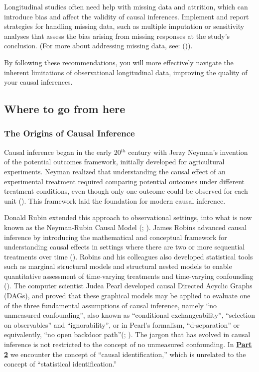 \documentclass[
  singlecolumn]{article}
\begin{document}
Longitudinal studies often need help with missing data and attrition,
which can introduce bias and affect the validity of causal inferences.
Implement and report strategies for handling missing data, such as
multiple imputation or sensitivity analyses that assess the bias arising
from missing responses at the study's conclusion. (For more about
addressing missing data, see:
()).

By following these recommendations, you will more effectively navigate
the inherent limitations of observational longitudinal data, improving
the quality of your causal inferences.

\subsection{Where to go from here}\label{where-to-go-from-here}

\subsubsection{The Origins of Causal
Inference}\label{the-origins-of-causal-inference}

Causal inference began in the early 20\(^{th}\) century with Jerzy
Neyman's invention of the potential outcomes framework, initially
developed for agricultural experiments. Neyman realized that
understanding the causal effect of an experimental treatment required
comparing potential outcomes under different treatment conditions, even
though only one outcome could be observed for each unit
(). This
framework laid the foundation for modern causal inference.

Donald Rubin extended this approach to observational settings, into what
is now known as the Neyman-Rubin Causal Model
(;
). James Robins advanced causal
inference by introducing the mathematical and conceptual framework for
understanding causal effects in settings where there are two or more
sequential treatments over time (). Robins and his colleagues also developed statistical tools such
as marginal structural models and structural nested models to enable
quantitative assessment of time-varying treatments and time-varying
confounding ().
The computer scientist Judea Pearl developed causal Directed Acyclic
Graphs (DAGs), and proved that these graphical models may be applied to
evaluate one of the three fundamental assumptions of causal inference,
namely ``no unmeasured confounding'', also known as ``conditional
exchangeability'', ``selection on observables'' and ``ignorability'', or
in Pearl's formalism, ``d-separation'' or equivalently, ``no open
backdoor path''(;
). The jargon that has
evolved in causal inference is not restricted to the concept of no
unmeasured confounding. In \hyperref[section-part2]{\textbf{Part 2}} we
encounter the concept of ``causal identification,'' which is unrelated
to the concept of ``statistical identification.''
\end{document}
